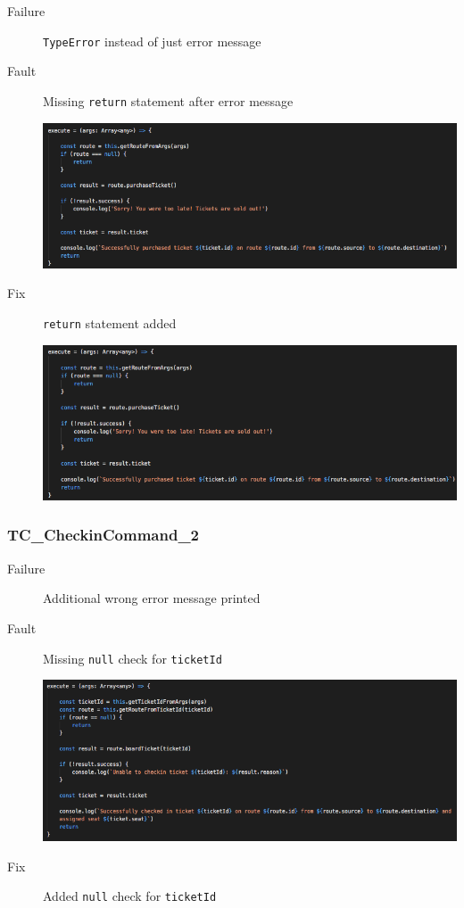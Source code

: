 \documentclass[11pt]{article}
\begin{document}
\begin{description}
\item[{Failure}] \texttt{TypeError} instead of just error message
\item[{Fault}] Missing \texttt{return} statement after error message
\begin{center}
\includegraphics[width=.9\linewidth]{./Iteration3.rtfd/Pasted Graphic 9.tiff.png}
\end{center}
\item[{Fix}] \texttt{return} statement added
\begin{center}
\includegraphics[width=.9\linewidth]{./Iteration3.rtfd/Pasted Graphic 16.tiff.png}
\end{center}
\end{description}

\subsubsection{TC\_CheckinCommand\_2}
\label{sec:org5044a19}

\begin{description}
\item[{Failure}] Additional wrong error message printed
\item[{Fault}] Missing \texttt{null} check for \texttt{ticketId}
\begin{center}
\includegraphics[width=.9\linewidth]{./Iteration3.rtfd/Pasted Graphic 10.tiff.png}
\end{center}
\item[{Fix}] Added \texttt{null} check for \texttt{ticketId}
\end{description}
\end{document}
